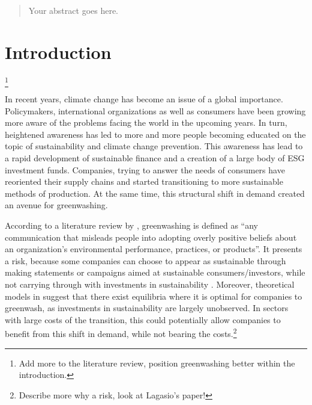 \documentclass[12pt]{article}
\author{Your Name}
\date{Date of submission: \today}
\begin{document}

\pagebreak
{}

\begin{abstract}
Your abstract goes here.


\end{abstract}
\pagebreak

\tableofcontents
\pagebreak
\listoffigures
\listoftables
\pagebreak

\setcounter{page}{1}

\section{Introduction}\label{sect:introduction}\footnote{Add more to the literature review, position greenwashing better within the introduction.}

In recent years, climate change has become an issue of a global importance. Policymakers, international 
organizations as well as consumers have been growing more aware of the problems facing the world in the upcoming years. In turn, heightened awareness has led to more and more people becoming educated on the topic of sustainability and climate change prevention. This awareness has lead to a rapid development of sustainable finance and a creation of a large body of ESG investment funds. Companies, trying to answer the needs of consumers have reoriented their supply chains and started transitioning to more sustainable methods of production. At the same time, this structural shift in demand created an avenue for greenwashing. 

According to a literature review by \textcite{lyonMeansEndGreenwash2015}, greenwashing is defined as ``any communication that misleads  people into adopting overly positive beliefs about an organization's  environmental performance, practices, or products''. It presents a risk, because some companies can choose to appear as sustainable through making statements or campaigns aimed at sustainable consumers/investors, while not carrying through with investments in sustainability \parencite{barrageAdvertisingEnvironmentalStewardship2020, marquisScrutinyNormsSelective2016, kimGreenwashVsBrownwash2015}. Moreover, theoretical models in \textcite{wuBadGreenwashingGood2020,  cartellierCanInvestorsCurb2023} suggest that there exist equilibria where it is optimal for companies to greenwash, as investments in sustainability are largely unobserved. In sectors with large costs of the transition, this could potentially allow companies to benefit from this shift in demand, while not bearing the costs.\footnote{Describe more why a risk, look at Lagasio's paper!}
\end{document}
